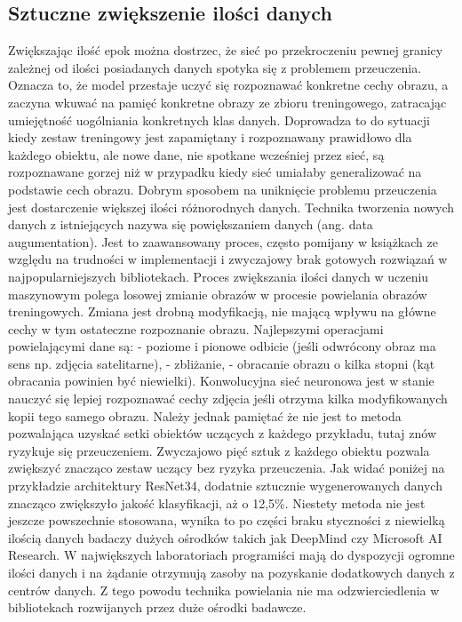 \documentclass[12pt,a4paper,twoside,titlepage,openright]{book}
\begin{document}
\subsection{Sztuczne zwiększenie ilości danych}
Zwiększając ilość epok można dostrzec, że sieć po przekroczeniu pewnej granicy zależnej od ilości posiadanych danych spotyka się z problemem przeuczenia. Oznacza to, że model przestaje uczyć się rozpoznawać konkretne cechy obrazu, a zaczyna wkuwać na pamięć konkretne obrazy ze zbioru treningowego, zatracając umiejętność uogólniania konkretnych klas danych. Doprowadza to do sytuacji kiedy zestaw treningowy jest zapamiętany i rozpoznawany prawidłowo dla każdego obiektu, ale nowe dane, nie spotkane wcześniej przez sieć, są rozpoznawane gorzej niż w przypadku kiedy sieć umiałaby generalizować na podstawie cech obrazu.
Dobrym sposobem na uniknięcie problemu przeuczenia jest dostarczenie większej ilości różnorodnych danych. Technika tworzenia nowych danych z istniejących nazywa się powiększaniem danych (ang. data augumentation). Jest to zaawansowany proces, często pomijany w książkach ze względu na trudności w implementacji i zwyczajowy brak gotowych rozwiązań w najpopularniejszych bibliotekach. 
Proces zwiększania ilości danych w uczeniu maszynowym polega losowej zmianie obrazów w procesie powielania obrazów treningowych. Zmiana jest drobną modyfikacją, nie mającą wpływu na główne cechy w tym ostateczne rozpoznanie obrazu. Najlepszymi operacjami powielającymi dane są: 
- poziome i pionowe odbicie (jeśli odwrócony obraz ma sens np. zdjęcia satelitarne),
- zbliżanie,
- obracanie obrazu o kilka stopni (kąt obracania powinien być niewielki). 
Konwolucyjna sieć neuronowa jest w stanie nauczyć się lepiej rozpoznawać cechy zdjęcia jeśli otrzyma kilka modyfikowanych kopii tego samego obrazu. Należy jednak pamiętać że nie jest to metoda pozwalająca uzyskać setki obiektów uczących z każdego przykładu, tutaj znów ryzykuje się przeuczeniem. Zwyczajowo pięć sztuk z każdego obiektu pozwala zwiększyć znacząco zestaw uczący bez ryzyka przeuczenia. 
Jak widać poniżej na przykładzie architektury ResNet34, dodatnie sztucznie wygenerowanych danych znacząco zwiększyło jakość klasyfikacji, aż o 12,5\%. Niestety metoda nie jest jeszcze powszechnie stosowana, wynika to po części braku styczności z niewielką ilością danych badaczy dużych ośrodków takich jak DeepMind czy Microsoft AI Research. W największych laboratoriach programiści mają do dyspozycji ogromne ilości danych i na żądanie otrzymują zasoby na pozyskanie dodatkowych danych z centrów danych. Z tego powodu technika powielania nie ma odzwierciedlenia w bibliotekach rozwijanych przez duże ośrodki badawcze. 
\end{document}
